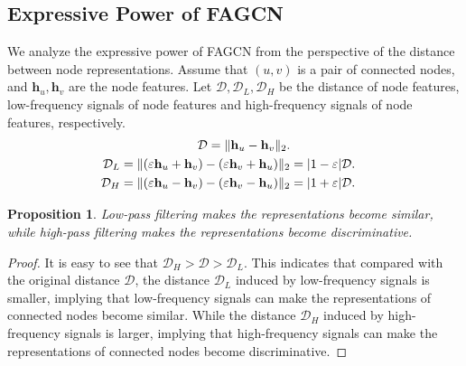 \documentclass[letterpaper]{article} %
\newtheorem{proposition}{Proposition}
\begin{document}
\subsection{Expressive Power of FAGCN}
\label{sec:expressive}

We analyze the expressive power of FAGCN from the perspective of the distance between node representations.
Assume that $(u, v)$ is a pair of connected nodes, and $\mathbf{h}_{u}, \mathbf{h}_{v}$ are the node features. Let $\mathcal{D}, \mathcal{D}_{L}, \mathcal{D}_{H}$ be the distance of node features, low-frequency signals of node features and high-frequency signals of node features, respectively.
\begin{align}
	\mathcal{D} = \| \mathbf{h}_{u}-\mathbf{h}_{v} \|_{2}. \notag \\
	\mathcal{D}_{L} = \| (\varepsilon\mathbf{h}_{u}+\mathbf{h}_{v}) - (\varepsilon\mathbf{h}_{v}+\mathbf{h}_{u}) \|_{2} &= | 1-\varepsilon |\mathcal{D}. \notag \\
	\mathcal{D}_{H} = \| (\varepsilon\mathbf{h}_{u}-\mathbf{h}_{v}) - (\varepsilon\mathbf{h}_{v}-\mathbf{h}_{u}) \|_{2} &= | 1+\varepsilon |\mathcal{D}. \notag
\end{align}


\begin{proposition}
\label{prop1}
	Low-pass filtering makes the representations become similar, while high-pass filtering makes the representations become discriminative.
\end{proposition}

\begin{proof}
	It is easy to see that $\mathcal{D}_{H} > \mathcal{D} > \mathcal{D}_{L}$.
	This indicates that compared with the original distance $\mathcal{D}$, the distance $\mathcal{D}_{L}$ induced by low-frequency signals is smaller, implying that low-frequency signals can make the representations of connected nodes become similar.
	While the distance $\mathcal{D}_{H}$ induced by high-frequency signals is larger, implying that high-frequency signals can make the representations of connected nodes become discriminative.
\end{proof}
\end{document}
